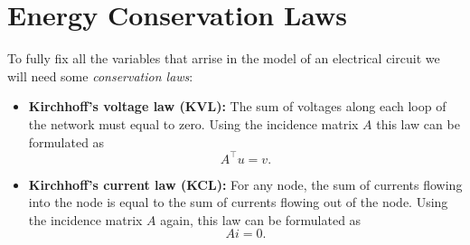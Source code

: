 \section{Energy Conservation Laws}
To fully fix all the variables that arrise in the model of an electrical circuit we will need some \emph{conservation laws}:
\begin{itemize}
	\item \textbf{Kirchhoff's voltage law (KVL):} \newline
	The sum of voltages along each loop of the network must equal to zero. Using the incidence matrix $A$ this law can be formulated as
	\begin{equation}
		\label{KVL}
		A^\top  u = v.
	\end{equation}
	\item \textbf{Kirchhoff's current law (KCL):} \newline
	For any node, the sum of currents flowing into the node is equal to the sum of currents flowing out of the node. Using the incidence matrix $A$ again, this law can be formulated as
	\begin{equation}
		\label{KCL}
		A  i = 0.
	\end{equation}
\end{itemize}

